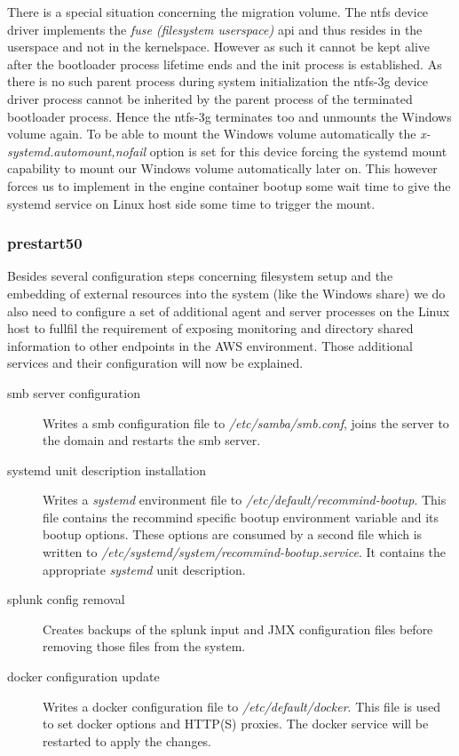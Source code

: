 \begin{description}
				There is a special situation concerning the migration volume. The ntfs device driver implements the \emph{fuse (filesystem userspace)} api and thus resides in the userspace and not in the kernelspace. However as such it cannot be kept alive after the bootloader process lifetime ends and the init process is established. As there is no such parent process during system initialization the ntfs-3g device driver process cannot be inherited by the parent process of the terminated bootloader process. Hence the ntfs-3g terminates too and unmounts the Windows volume again. To be able to mount the Windows volume automatically the \emph{x-systemd.automount,nofail} option is set for this device forcing the systemd mount capability to mount our Windows volume automatically later on. This however forces us to implement in the engine container bootup some wait time to give the systemd service on Linux host side some time to trigger the mount.
			\end{description}
			
			\subsubsection{prestart50}
			Besides several configuration steps concerning filesystem setup and the embedding of external resources into the system (like the Windows share) we do also need to configure a set of additional agent and server processes on the Linux host to fullfil the requirement of exposing monitoring and directory shared information to other endpoints in the AWS environment. Those additional services and their configuration will now be explained.
			\begin{description}
				\item[smb server configuration] Writes a smb configuration file to \emph{/etc/samba/smb.conf}, joins the server to the domain and restarts the smb server.
				\item[systemd unit description installation] Writes a \emph{systemd} environment file to \emph{/etc/default/recommind-bootup}. This file contains the recommind specific bootup environment variable and its bootup options. These options are consumed by a second file which is written to \emph{/etc/systemd/system/recommind-bootup.service}. It contains the appropriate \emph{systemd} unit description.
				\item[splunk config removal] Creates backups of the splunk input and JMX configuration files before removing those files from the system.
				\item[docker configuration update] Writes a docker configuration file to \emph{/etc/default/docker}. This file is used to set docker options and HTTP(S) proxies. The docker service will be restarted to apply the changes.
			\end{description}
			
